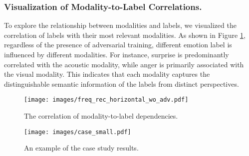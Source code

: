 
\subsubsection{Visualization of Modality-to-Label Correlations.}
To explore the relationship between modalities and labels, we visualized the correlation of labels with their most relevant modalities. As shown in Figure \ref{fig:modality-to-label}, regardless of the presence of adversarial training, different emotion label is influenced by different modalities. For instance, surprise is predominantly correlated with the acoustic modality, while anger is primarily associated with the visual modality. This indicates that each modality captures the distinguishable semantic information of the labels from distinct perspectives.

\begin{figure}[t]
    \centering
\texttt{[image: images/freq\_rec\_horizontal\_wo\_adv.pdf]}
    \vspace{-1.0em}
    \caption{The correlation of modality-to-label dependencies.}
    \label{fig:modality-to-label}
\vspace{-0.5em}
\end{figure}

\begin{figure}[t!] 
    \centering %
\texttt{[image: images/case\_small.pdf]}
    \vspace{-0.6em}
    \caption{An example of the case study results.}
    \label{fig:case study}
    \vspace{-1em}
\end{figure}

